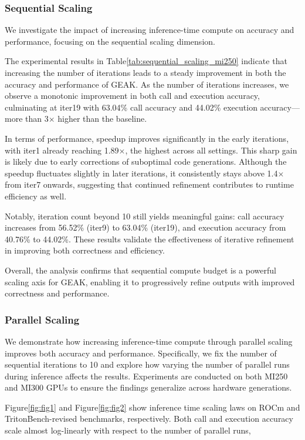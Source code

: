 \subsubsection{Sequential Scaling}
We investigate the impact of increasing inference-time compute on accuracy and performance, focusing on the sequential scaling dimension.

The experimental results in Table\ref{tab:sequential_scaling_mi250} indicate that increasing the number of iterations leads to a steady improvement in both the accuracy and performance of GEAK. As the number of iterations increases, we observe a monotonic improvement in both call and execution accuracy, culminating at iter19 with 63.04\% call accuracy and 44.02\% execution accuracy—more than 3× higher than the baseline.

In terms of performance, speedup improves significantly in the early iterations, with iter1 already reaching 1.89×, the highest across all settings. This sharp gain is likely due to early corrections of suboptimal code generations. Although the speedup fluctuates slightly in later iterations, it consistently stays above 1.4× from iter7 onwards, suggesting that continued refinement contributes to runtime efficiency as well.

Notably, iteration count beyond 10 still yields meaningful gains: call accuracy increases from 56.52\% (iter9) to 63.04\% (iter19), and execution accuracy from 40.76\% to 44.02\%. These results validate the effectiveness of iterative refinement in improving both correctness and efficiency.

Overall, the analysis confirms that sequential compute budget is a powerful scaling axis for GEAK, enabling it to progressively refine outputs with improved correctness and performance.



\subsubsection{Parallel Scaling}
We demonstrate how increasing inference-time compute through parallel scaling improves both accuracy and performance. Specifically, we fix the number of sequential iterations to 10 and explore how varying the number of parallel runs during inference affects the results. Experiments are conducted on both MI250 and MI300 GPUs to ensure the findings generalize across hardware generations.

Figure\ref{fig:fig1} and Figure\ref{fig:fig2} show inference time scaling laws on ROCm and TritonBench-revised benchmarks, respectively. Both call and execution accuracy scale almost log-linearly with respect to the number of parallel runs,

